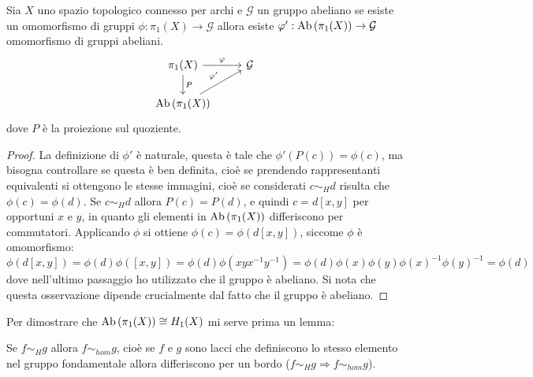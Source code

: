 
\begin{osservation}
  Sia $ X $ uno spazio topologico connesso per archi e $ \mathcal{G} $ un gruppo
  abeliano se esiste un omomorfismo di gruppi $ \phi: \pi_1(X) \to \mathcal{G} $ allora
  esiste $ \varphi' : \mathrm{Ab}\left( \pi_1(X) \right) \to \mathcal{G} $ omomorfismo di gruppi abeliani.
  \[
    \begin{tikzcd}
      \pi_1(X) \arrow{r}{\phi} \arrow{d}{P} & \mathcal{G} \\
      \Ab{\pi_1(X)} \arrow{ur}{\phi'}
    \end{tikzcd}
  \]
  dove $ P $ è la proiezione sul quoziente.
\end{osservation}
\begin{proof}
  La definizione di $ \phi' $ è naturale, questa è tale che
  $ \phi'(P(c)) = \phi(c) $, ma bisogna controllare se questa è ben definita, cioè se
  prendendo rappresentanti equivalenti si ottengono le stesse immagini, cioè se
  considerati $ c \sim_H d $ risulta che $ \phi(c) = \phi(d) $. Se
  $ c \sim_H d $ allora $ P(c) = P(d) $, e quindi $ c = d[x,y] $ per opportuni
  $ x $ e $ y $, in quanto gli elementi in $ \mathrm{Ab}\left( \pi_1(X) \right) $ differiscono per
  commutatori. Applicando $ \phi $ si ottiene $ \phi(c) = \phi(d[x,y]) $, siccome
  $ \phi $ è omomorfismo:
  \[
    \phi(d[x,y]) = \phi(d)\phi([x,y]) = \phi(d) \phi(xyx^{-1}y^{-1}) = \phi(d) \phi(x) \phi(y) \phi(x)^{-1} \phi(y)^{-1} = \phi(d)
  \]
  dove nell'ultimo passaggio ho utilizzato che il gruppo è abeliano.
  Si nota che questa osservazione dipende crucialmente dal fatto che il gruppo è abeliano.
\end{proof}
\hfill\newline\newline
Per dimostrare che $ \mathrm{Ab}\left( \pi_1(X) \right) \cong H_1(X) $ mi serve prima un lemma:
\begin{lemma}
  Se $ f \sim_H g $ allora $ f \sim_{hom} g $, cioè se $ f $ e $ g $ sono lacci che
  definiscono lo stesso elemento nel gruppo fondamentale allora differiscono per
  un bordo ($ f \sim_H g \Rightarrow f \sim_{hom} g $).
\end{lemma}
